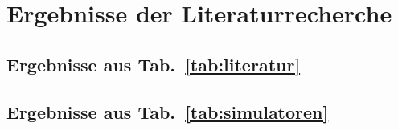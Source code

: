 \chapter{Ergebnisse der Literaturrecherche}\label{results}

\section{Ergebnisse aus Tab.~\ref{tab:literatur}}


\section{Ergebnisse aus Tab.~\ref{tab:simulatoren}}

